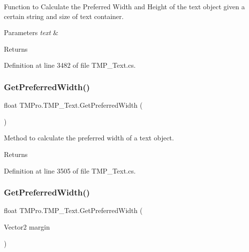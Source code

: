 Function to Calculate the Preferred Width and Height of the text object given a certain string and size of text container. 


\begin{DoxyParams}{Parameters}
{\em text} & \\
\hline
\end{DoxyParams}
\begin{DoxyReturn}{Returns}

\end{DoxyReturn}


Definition at line 3482 of file T\+M\+P\+\_\+\+Text.\+cs.

\mbox{\label{class_t_m_pro_1_1_t_m_p___text_abb5c80b9a45b89007024c857593e12c8}} 
\subsubsection{\texorpdfstring{GetPreferredWidth()}{GetPreferredWidth()}\hspace{0.1cm}{\footnotesize\ttfamily [1/2]}}
{\footnotesize\ttfamily float T\+M\+Pro.\+T\+M\+P\+\_\+\+Text.\+Get\+Preferred\+Width (\begin{DoxyParamCaption}{ }\end{DoxyParamCaption})\hspace{0.3cm}{\ttfamily [protected]}}



Method to calculate the preferred width of a text object. 

\begin{DoxyReturn}{Returns}

\end{DoxyReturn}


Definition at line 3505 of file T\+M\+P\+\_\+\+Text.\+cs.

\mbox{\label{class_t_m_pro_1_1_t_m_p___text_a9d95266b16671a64895102e97b936029}} 
\subsubsection{\texorpdfstring{GetPreferredWidth()}{GetPreferredWidth()}\hspace{0.1cm}{\footnotesize\ttfamily [2/2]}}
{\footnotesize\ttfamily float T\+M\+Pro.\+T\+M\+P\+\_\+\+Text.\+Get\+Preferred\+Width (\begin{DoxyParamCaption}\item[{Vector2}]{margin }\end{DoxyParamCaption})\hspace{0.3cm}{\ttfamily [protected]}}



